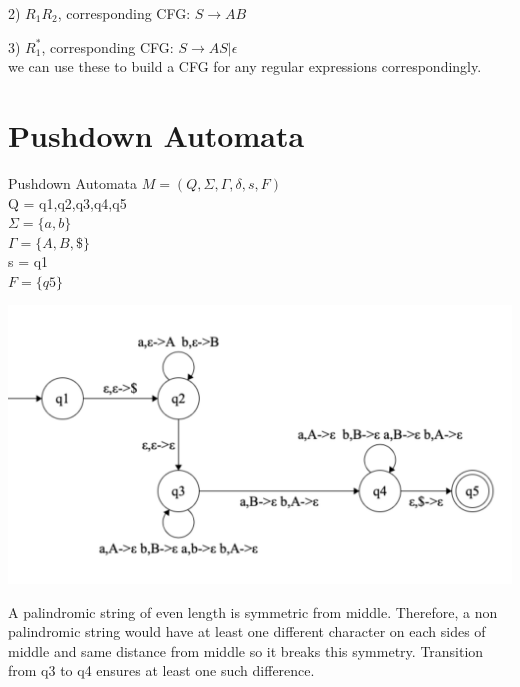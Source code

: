 \documentclass[12pt]{article}
\begin{document}
2) $R_1R_2$, corresponding CFG: $S \rightarrow AB$

3) $R_1^*$, corresponding CFG:  $S \rightarrow AS|\epsilon$\\

we can use these to build a CFG for any regular expressions correspondingly.
\pagebreak


\section{Pushdown Automata}

Pushdown Automata $M = (Q,\Sigma,\Gamma, \delta, s, F)$\\
Q = {q1,q2,q3,q4,q5}\\
$\Sigma = \{a,b\}$\\
$\Gamma = \{A,B,\$\}$\\
s = q1\\
$F = \{q5\}$

\includegraphics[scale = 0.3]{2}


A palindromic string of even length is symmetric from middle. Therefore, a non palindromic string would have at least one different character on each sides of middle and same distance from middle so it breaks this symmetry. Transition from q3 to q4 ensures at least one such difference.
\end{document}
